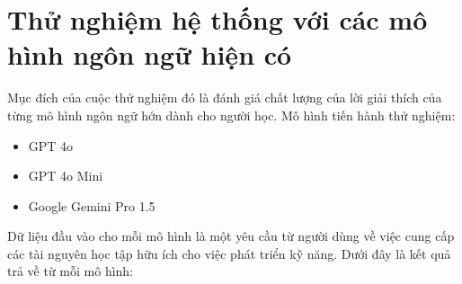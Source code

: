 \section{Thử nghiệm hệ thống với các mô hình ngôn ngữ hiện có}

Mục đích của cuộc thử nghiệm đó là đánh giá chất lượng của lời giải thích của từng mô hình ngôn ngữ hớn dành cho người học. Mô hình tiến hành thử nghiệm:
\begin{itemize}
    \item GPT 4o
    \item GPT 4o Mini
    \item Google Gemini Pro 1.5
\end{itemize}
Dữ liệu đầu vào cho mỗi mô hình là một yêu cầu từ người dùng về việc cung cấp các tài nguyên học tập hữu ích cho việc phát triển kỹ năng. Dưới đây là kết quả trả về từ mỗi mô hình:
